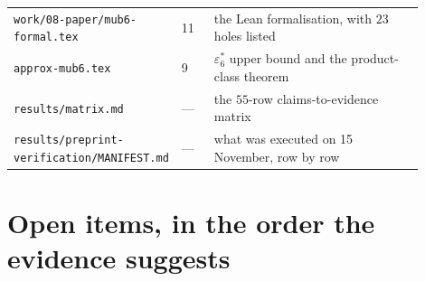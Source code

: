 \documentclass[10pt]{article}
\theoremstyle{definition}
\newcommand{\file}[1]{\texttt{\small #1}}
\begin{document}
\begin{center}
\begin{longtable}{@{}L{0.30\linewidth}L{0.08\linewidth}L{0.52\linewidth}@{}}
\file{work/\allowbreak{}08-\allowbreak{}paper/\allowbreak{}mub6-\allowbreak{}formal.tex} & 11 & the Lean formalisation, with $23$ holes listed \\
\file{approx-\allowbreak{}mub6.tex} & 9 & $\varepsilon_6^*$ upper bound and the product-class theorem \\
\file{results/\allowbreak{}matrix.md} & --- & the $55$-row claims-to-evidence matrix \\
\file{results/\allowbreak{}preprint-\allowbreak{}verification/\allowbreak{}MANIFEST.md} & --- & what was executed on 15 November, row by row \\
\bottomrule
\end{longtable}
\end{center}

\section{Open items, in the order the evidence suggests}
\end{document}
